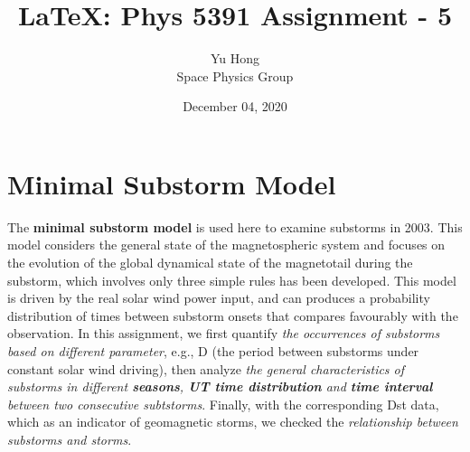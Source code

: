 \documentclass[12pt, letterpaper]{article} %
\begin{document}
\title{\LaTeX: Phys 5391 Assignment - 5} %
\author{Yu Hong\\Space Physics Group} %
\date{December 04, 2020}  %
\maketitle %
\linenumbers %



\section{Minimal Substorm Model} %

The \textbf{minimal substorm model} is used here to examine substorms in 2003. This model considers the general state of the magnetospheric system and focuses on the evolution of the global dynamical state of the magnetotail during the substorm, which involves only three simple rules has been developed. This model is driven by the real solar wind power input, and can produces a probability distribution of times between substorm onsets that compares favourably with the observation. In this assignment, we first quantify \emph{the occurrences of substorms based on different parameter}, e.g., D (the period between substorms under constant solar wind driving), then analyze \emph{the general characteristics of substorms in different \textbf{seasons}, \textbf{UT time distribution} and \textbf{time interval} between two consecutive subtstorms}. Finally, with the corresponding Dst data, which as an indicator of geomagnetic storms, we checked the \emph{relationship between substorms and storms}. 


\end{document}

